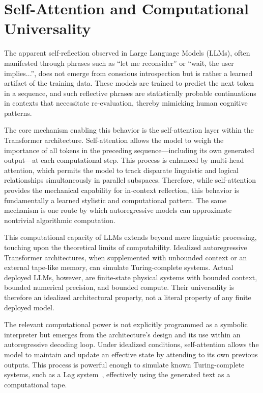 \documentclass[%
  reprint,
  superscriptaddress,
  showpacs,
  showkeys,
  amsmath,amssymb,
  pra,
  longbibliography,
  floatfix,
  x11names
]{revtex4-2}
\begin{document}
\section{Self-Attention and Computational Universality}

The apparent self-reflection observed in Large Language Models (LLMs), often manifested through phrases such as ``let me reconsider'' or ``wait, the user implies...'', does not emerge from conscious introspection but is rather a learned artifact of the training data. These models are trained to predict the next token in a sequence, and such reflective phrases are statistically probable continuations in contexts that necessitate re-evaluation, thereby mimicking human cognitive patterns.

The core mechanism enabling this behavior is the self-attention layer within the Transformer architecture. Self-attention allows the model to weigh the importance of all tokens in the preceding sequence---including its own generated output---at each computational step. This process is enhanced by multi-head attention, which permits the model to track disparate linguistic and logical relationships simultaneously in parallel subspaces. Therefore, while self-attention provides the mechanical capability for in-context reflection, this behavior is fundamentally a learned stylistic and computational pattern. The same mechanism is one route by which autoregressive models can approximate nontrivial algorithmic computation.

This computational capacity of LLMs extends beyond mere linguistic processing, touching upon the theoretical limits of computability. Idealized autoregressive Transformer architectures, when supplemented with unbounded context or an external tape-like memory, can simulate Turing-complete systems. Actual deployed LLMs, however, are finite-state physical systems with bounded context, bounded numerical precision, and bounded compute. Their universality is therefore an idealized architectural property, not a literal property of any finite deployed model.

The relevant computational power is not explicitly programmed as a symbolic interpreter but emerges from the architecture's design and its use within an autoregressive decoding loop.
Under idealized conditions, self-attention allows the model to maintain and update an effective state by attending to its own previous outputs. This process is powerful enough to simulate known Turing-complete systems, such as a Lag system~\cite{schuurmans2024autoregressivelargelanguagemodels}, effectively using the generated text as a computational tape.
\end{document}
